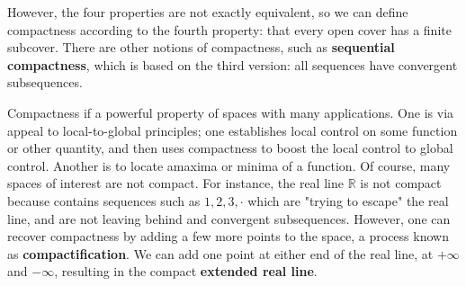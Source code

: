   However, the four properties are not exactly equivalent, so we can define compactness according to the fourth property: that every open cover has a finite subcover. There are other notions of compactness, such as \textbf{sequential compactness}, which is based on the third version: all sequences have convergent subsequences. 
  
  Compactness if a powerful property of spaces with many applications. One is via appeal to local-to-global principles; one establishes local control on some function or other quantity, and then uses compactness to boost the local control to global control. Another is to locate amaxima or minima of a function. Of course, many spaces of interest are not compact. For instance, the real line $\mathbb{R}$ is not compact because contains sequences such as $1, 2, 3, \cdot$ which are "trying to escape" the real line, and are not leaving behind and convergent subsequences. However, one can recover compactness by adding a few more points to the space, a process known as \textbf{compactification}. We can add one point at either end of the real line, at $+\infty$ and $-\infty$, resulting in the compact \textbf{extended real line}. 


